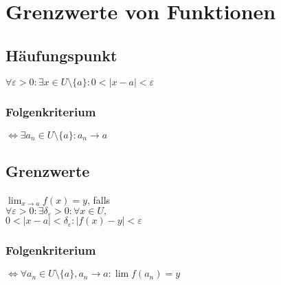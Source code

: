 \section*{Grenzwerte von Funktionen}

\subsection*{Häufungspunkt}
$\forall \varepsilon>0: \exists x\in U\setminus\{a\}: 0<|x-a|<\varepsilon$

\subsubsection*{Folgenkriterium}
$\iff \exists a_n \in U\setminus\{a\}: a_n \longrightarrow a$

\subsection*{Grenzwerte}
$\displaystyle \lim_{x\to a}f(x)=y$, falls \\
$\forall \varepsilon>0:\exists \delta_\varepsilon>0:\forall x\in U,$\\ 
$0<|x-a|<\delta_\varepsilon: |f(x)-y|<\varepsilon$

\subsubsection*{Folgenkriterium}
$\Leftrightarrow \forall a_n\in U\setminus\{a\}, a_n \to a: \lim f(a_n)=y$
